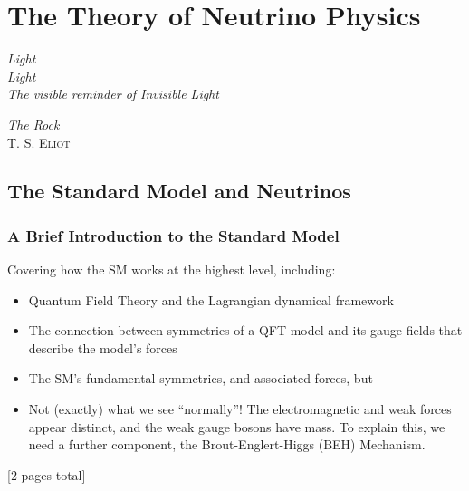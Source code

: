 
\chapter{The Theory of Neutrino Physics}\label{chap:theory}
\setlength{\epigraphwidth}{.45\textwidth}
\epigraph{\textit{Light\\Light\\The visible reminder of Invisible Light}}{\textit{The Rock}\\\textsc{T. S. Eliot}}
\setlength{\epigraphwidth}{.4\textwidth}
{
    \color{blue}
\section{The Standard Model and Neutrinos}
\subsection{A Brief Introduction to the Standard Model}
Covering how the SM works at the highest level, including:
\begin{itemize}
    \item Quantum Field Theory and the Lagrangian dynamical framework
    \item The connection between symmetries of a QFT model and its gauge fields that describe the model's forces
    \item The SM's fundamental symmetries, and associated forces, but ---
    \item Not (exactly) what we see ``normally''! The electromagnetic and weak forces appear distinct, and the weak gauge bosons have mass. To explain this, we need a further component, the Brout-Englert-Higgs (BEH) Mechanism. 
\end{itemize}
[2 pages total]
}

